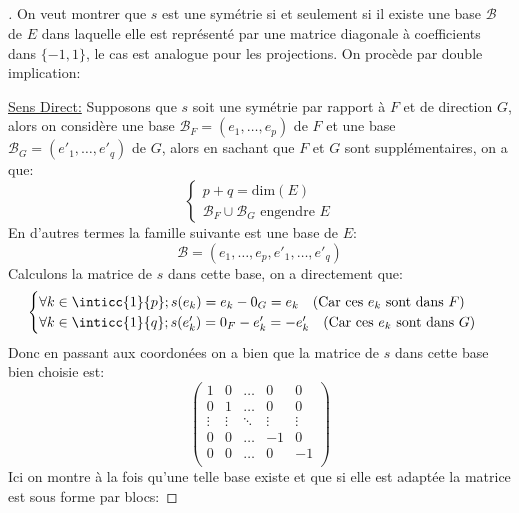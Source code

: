 \documentclass{report}
\begin{document}
   \subsection*{}
   \begin{proof}[\unskip\nopunct]
      On veut montrer que \(s\) est une symétrie si et seulement si il existe une base \(\mathscr{B}\) de \(E\) dans laquelle elle est représenté par une matrice diagonale à coefficients dans \(\{-1, 1\}\), le cas est analogue pour les projections. On procède par double implication:\<

      \uline{Sens Direct:} Supposons que \(s\) soit une symétrie par rapport à \(F\) et de direction \(G\), alors on considère une base \(\mathscr{B}_F = (e_1, \ldots, e_p)\) de \(F\) et une base \(\mathscr{B}_G = (e'_1, \ldots, e'_q)\) de \(G\), alors en sachant que \(F\) et \(G\) sont supplémentaires, on a que:
      \[
         \begin{cases}
            p + q = \text{dim}(E)\\
            \mathscr{B}_F \cup \mathscr{B}_G \text{ engendre } E
         \end{cases}   
      \]
      En d'autres termes la famille suivante est une base de \(E\):
      \[
         \mathscr{B} = (e_1, \ldots, e_p, e'_1, \ldots, e'_q)
      \]
      Calculons la matrice de \(s\) dans cette base, on a directement que:
      \[
         \begin{cases}
            \forall k \in \inticc{1}{p} ; s(e_k) = e_k - 0_G = e_k \quad \text{(Car ces \(e_k\) sont dans \(F\))}\\
            \forall k \in \inticc{1}{q} ; s(e'_k) = 0_F - e'_k = -e'_k \quad \text{(Car ces \(e_k\) sont dans \(G\))}\\
         \end{cases}   
      \]
      Donc en passant aux coordonées on a bien que la matrice de \(s\) dans cette base bien choisie est:
      \[
         \begin{pmatrix}
            1 & 0 & \ldots & 0 & 0\\
            0 & 1 & \ldots & 0 & 0\\
            \vdots & \vdots & \ddots & \vdots & \vdots \\
            0 & 0 & \ldots & -1 & 0\\
            0 & 0 & \ldots & 0 & -1\\
         \end{pmatrix}   
      \]
      Ici on montre à la fois qu'une telle base existe et que si elle est adaptée la matrice est sous forme par blocs:

\end{proof}
\end{document}
